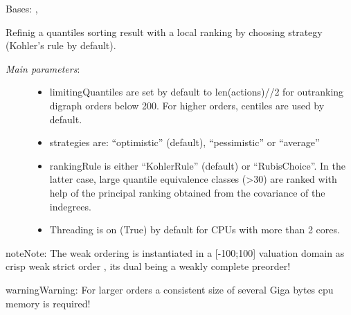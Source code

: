 \documentclass[letterpaper,10pt,english]{sphinxmanual}
\begin{document}
\begin{fulllineitems}
\label{techDoc:weakOrders.QuantilesRankingDigraph}
Bases: {\hyperref[techDoc:weakOrders.WeakOrder]{\emph{}}}, {\hyperref[techDoc:sortingDigraphs.QuantilesSortingDigraph]{\emph{}}}

Refinig a quantiles sorting result
with a local ranking by choosing strategy (Kohler's rule by default).
\begin{description}
\item[{\emph{Main parameters}:}] \leavevmode\begin{itemize}
\item {} 
limitingQuantiles are set by default to len(actions)//2
for outranking digraph orders below 200.
For higher orders, centiles are used by default.

\item {} 
strategies are: ``optimistic'' (default), ``pessimistic'' or ``average''

\item {} 
rankingRule is either ``KohlerRule'' (default) or ``RubisChoice''. In the latter case, large quantile equivalence classes (\textgreater{}30) are ranked with help of the principal ranking obtained from the covariance of the indegrees.

\item {} 
Threading is on (True) by default for CPUs with more than 2 cores.

\end{itemize}

\end{description}

\begin{notice}{note}{Note:}
The weak ordering is instantiated in a {[}-100;100{]} valuation domain as crisp weak strict order ,
its dual being a weakly complete preorder!
\end{notice}

\begin{notice}{warning}{Warning:}
For larger orders a consistent size of several
Giga bytes cpu memory is required!
\end{notice}


\end{fulllineitems}
\end{document}
